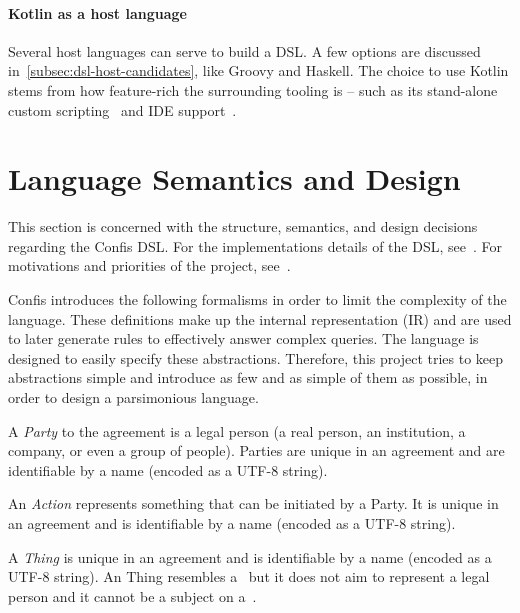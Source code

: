 \paragraph{Kotlin as a host language} Several host languages can serve to build a DSL.
A few options are discussed in~\autoref{subsec:dsl-host-candidates}, like Groovy and Haskell.
The choice to use Kotlin stems from how feature-rich the surrounding tooling is -- such as its stand-alone custom scripting~\cite{kotlinScriptKeep} and IDE support~\cite{intelliJRepo}.


\section{Language Semantics and Design}\label{sec:language-semantics}

This section is concerned with the structure, semantics, and design decisions regarding the Confis DSL.
For the implementations details of the DSL, see~.
For motivations and priorities of the project, see~.

Confis introduces the following formalisms in order to limit the complexity of the language.
These definitions make up the internal representation (IR) and are used to later generate rules to effectively answer complex queries.
The language is designed to easily specify these abstractions.
Therefore, this project tries to keep abstractions simple and introduce as few and as simple of them as possible, in order to design a parsimonious language.

\begin{definition}[Party]
    \label{def:party}

    A \emph{Party} to the agreement is a legal person (a real person, an institution, a company, or even a group of people).
    Parties are unique in an agreement and are identifiable by a name (encoded as a UTF-8 string).
\end{definition}

\begin{definition}[Action]
    \label{def:action}
    An \emph{Action} represents something that can be initiated by a Party.
    It is unique in an agreement and is identifiable by a name (encoded as a UTF-8 string).
\end{definition}

\begin{definition}[Thing]
    \label{def:thing}
    A \emph{Thing} is unique in an agreement and is identifiable by a name (encoded as a UTF-8 string).
    An Thing resembles a~ but it does not aim to represent a legal person and it cannot be a subject on a~.
\end{definition}

